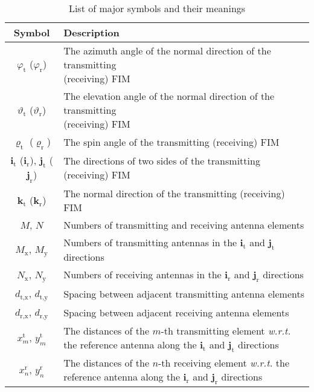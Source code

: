 \documentclass[lettersize,journal]{IEEEtran}
\begin{document}
\begin{table}[!t]
\renewcommand\arraystretch{1.5}
\centering
\scriptsize
\caption{List of major symbols and their meanings}
\begin{tabular}{c|l}
\hline
Symbol & Description \\ \hline
$\varphi_{\textrm{t}}$ ($\varphi_{\textrm{r}}$) & \makecell[l]{The azimuth angle of the normal direction of the transmitting \\ (receiving) FIM} \\ \hline
$\vartheta_{\textrm{t}}$ ($\vartheta_{\textrm{r}}$) & \makecell[l]{The elevation angle of the normal direction of the transmitting\\ (receiving) FIM} \\ \hline
$\varrho_{\textrm{t}}$ ($ \varrho_{\textrm{r}}$) & The spin angle of the transmitting (receiving) FIM \\ \hline
$\mathbf{i}_{\textrm{t}}$ ($\mathbf{i}_{\textrm{r}}$), $\mathbf{j}_{\textrm{t}}$ ($\mathbf{j}_{\textrm{r}}$) & The directions of two sides of the transmitting (receiving) FIM \\ \hline
$\mathbf{k}_{\textrm{t}}$ ($\mathbf{k}_{\textrm{r}} $) & The normal direction of the transmitting (receiving) FIM \\ \hline
$M$, $N$ & Numbers of transmitting and receiving antenna elements \\ \hline
$M_{\textrm{x}}$, $M_{\textrm{y}}$ & Numbers of transmitting antennas in the $\mathbf{i}_{\textrm{t}}$ and $\mathbf{j}_{\textrm{t}}$ directions\\ \hline
$N_{\textrm{x}}$, $N_{\textrm{y}}$ & Numbers of receiving antennas in the $\mathbf{i}_{\textrm{r}}$ and $\mathbf{j}_{\textrm{r}}$ directions\\ \hline
$d_{\textrm{t},\textrm{x}}$, $d_{\textrm{t},\textrm{y}}$ & Spacing between adjacent transmitting antenna elements\\ \hline
$d_{\textrm{r},\textrm{x}}$, $d_{\textrm{r},\textrm{y}}$ & Spacing between adjacent receiving antenna elements\\ \hline
$x_{m}^{\textrm{t}}$, $y_{m}^{\textrm{t}}$ & \makecell[l]{The distances of the $m$-th transmitting element \emph{w.r.t.} the\\reference antenna along the $\mathbf{i}_{\textrm{t}}$ and $\mathbf{j}_{\textrm{t}}$ directions} \\ \hline
$x_{n}^{\textrm{r}}$, $y_{n}^{\textrm{r}}$ & \makecell[l]{The distances of the $n$-th receiving element \emph{w.r.t.} the\\reference antenna along the $\mathbf{i}_{\textrm{r}}$ and $\mathbf{j}_{\textrm{r}}$ directions} \\ \hline

\end{tabular}
\end{table}
\end{document}
